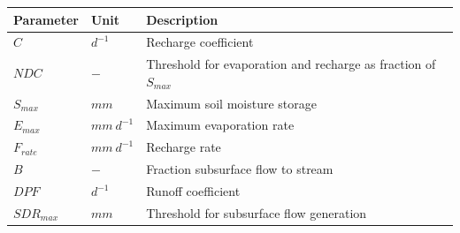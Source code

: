\begin{table}[htbp]
  \centering
    \begin{tabular}{lll}
    \toprule
    Parameter & Unit  & Description \\
    \midrule
    $C$   & $d^{-1}$ & Recharge coefficient \\
    $NDC$ & $-$   & Threshold for evaporation and recharge as fraction of $S_{max}$ \\
    $S_{max}$ & $mm$  & Maximum soil moisture storage \\
    $E_{max}$ & $mm~d^{-1}$ & Maximum evaporation rate \\
    $F_{rate}$ & $mm~d^{-1}$ & Recharge rate \\
    $B$   & $-$   & Fraction subsurface flow to stream \\
    $DPF$ & $d^{-1}$ & Runoff coefficient \\
    $SDR_{max}$ & $mm$  & Threshold for subsurface flow generation \\
    \bottomrule
    \end{tabular}%
  \label{tab:addlabel}%
\end{table}%
